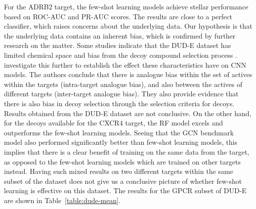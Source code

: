 For the ADRB2 target, the few-shot learning models achieve stellar performance based on ROC-AUC and PR-AUC scores. The results are close to a perfect classifier, which raises concerns about the underlying data. Our hypothesis is that the underlying data contains an inherent bias, which is confirmed by further research on the matter. Some studies indicate that the DUD-E dataset has limited chemical space and bias from the decoy compound selection process \cite{smusz2013influence, wallach2018most}. \citet{chen2019hidden} investigate this further to establish the effect these characteristics have on CNN models. The authors conclude that there is analogue bias within the set of actives within the targets (intra-target analogue bias), and also between the actives of different targets (inter-target analogue bias). They also provide evidence that there is also bias in decoy selection through the selection criteria for decoys. Results obtained from the DUD-E dataset are not conclusive. On the other hand, for the decoys available for the CXCR4 target, the RF model excels and outperforms the few-shot learning models. Seeing that the GCN benchmark model also performed significantly better than few-shot learning models, this implies that there is a clear benefit of training on the same data from the target, as opposed to the few-shot learning models which are trained on other targets instead. Having such mixed results on two different targets within the same subset of the dataset does not give us a conclusive picture of whether few-shot learning is effective on this dataset. The results for the GPCR subset of DUD-E are shown in Table~\ref{table:dude-mean}.

